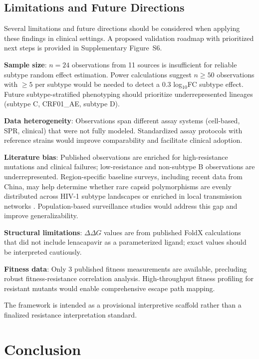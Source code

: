 \documentclass[12pt,a4paper]{article}
\begin{document}
\subsection{Limitations and Future Directions}

Several limitations and future directions should be considered when applying these findings in clinical settings. A proposed validation roadmap with prioritized next steps is provided in Supplementary Figure~S6.

\textbf{Sample size}: $n=24$ observations from 11 sources is insufficient for reliable subtype random effect estimation. Power calculations suggest $n \geq 50$ observations with $\geq 5$ per subtype would be needed to detect a 0.3 log$_{10}$FC subtype effect. Future subtype-stratified phenotyping should prioritize underrepresented lineages (subtype C, CRF01\_AE, subtype D).

\textbf{Data heterogeneity}: Observations span different assay systems (cell-based, SPR, clinical) that were not fully modeled. Standardized assay protocols with reference strains would improve comparability and facilitate clinical adoption.

\textbf{Literature bias}: Published observations are enriched for high-resistance mutations and clinical failures; low-resistance and non-subtype B observations are underrepresented. Region-specific baseline surveys, including recent data from China, may help determine whether rare capsid polymorphisms are evenly distributed across HIV-1 subtype landscapes or enriched in local transmission networks \cite{Lin2024}. Population-based surveillance studies would address this gap and improve generalizability.

\textbf{Structural limitations}: $\Delta\Delta G$ values are from published FoldX calculations that did not include lenacapavir as a parameterized ligand; exact values should be interpreted cautiously.

\textbf{Fitness data}: Only 3 published fitness measurements are available, precluding robust fitness-resistance correlation analysis. High-throughput fitness profiling for resistant mutants would enable comprehensive escape path mapping.

The framework is intended as a provisional interpretive scaffold rather than a finalized resistance interpretation standard.

\section{Conclusion}
\end{document}
